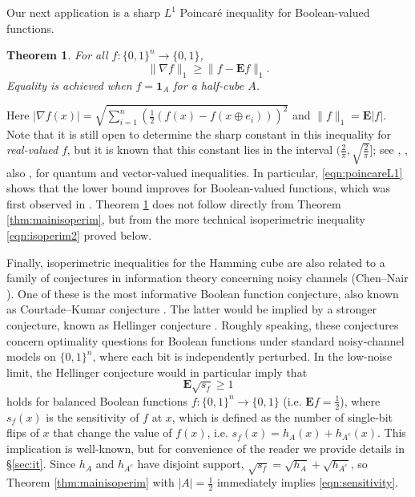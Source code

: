 \documentclass[11pt]{amsart}
\theoremstyle{plain}
\newtheorem{thm}{Theorem}[section]
\theoremstyle{definition}
\theoremstyle{remark}
\numberwithin{equation}{section}
\begin{document}
Our next application is a sharp $L^1$ Poincar\'e inequality for Boolean-valued functions.
\begin{thm}\label{thm:poincare} For all $f:\{0,1\}^n\to \{0,1\}$,
\begin{equation}\label{eqn:poincareL1}
\|\nabla f\|_1\ge \|f-\mathbf{E}f\|_1.
\end{equation}
Equality is achieved when $f=\mathbf{1}_A$ for a half-cube $A$.
\end{thm}
Here $|\nabla f(x)|=\sqrt{\sum_{i=1}^n (\tfrac12(f(x)-f(x\oplus e_i)))^2}$ and $\|f\|_1=\mathbf{E} |f|$. Note that it is still open to determine the sharp constant in this inequality for {\it real-valued} $f$, but it is known that this constant lies in the interval $(\frac2{\pi},\sqrt{\frac{2}{\pi}}]$; see \cite{BELP08}, \cite{ILvHV}, also \cite{haonan1}, \cite{Esken1} for quantum and vector-valued inequalities. In particular, \eqref{eqn:poincareL1} shows that the lower bound improves for Boolean-valued functions, which was first observed in \cite{BIM23}.
Theorem \ref{thm:poincare} does not follow directly from Theorem \ref{thm:mainisoperim}, but from the more technical isoperimetric inequality \eqref{eqn:isoperim2} proved below.

Finally, isoperimetric inequalities for the Hamming cube are also related to a family of conjectures in information theory concerning noisy channels (Chen--Nair \cite{CN24}). One of these is the most informative Boolean function conjecture, also known as Courtade--Kumar conjecture \cite{KC13}.
The latter would be implied by a stronger conjecture, known as Hellinger conjecture \cite{ABCJN17, CGN25}. Roughly speaking, these conjectures concern optimality questions for Boolean functions under standard noisy-channel models on $\{0,1\}^n$, where each bit is independently perturbed.
In the low-noise limit, the Hellinger conjecture would in particular imply that
\begin{equation}\label{eqn:sensitivity}
\mathbf{E}\sqrt{s_f} \ge 1
\end{equation}
holds for balanced Boolean functions $f:\{0,1\}^n\to \{0,1\}$ (i.e. $\mathbf{E}f=\tfrac12$), where $s_f(x)$ is the sensitivity of $f$ at $x$, which is defined as the number of single-bit flips of $x$ that change the value of $f(x)$, i.e. $s_f(x)=h_A(x)+h_{A^c}(x)$.
This implication is well-known, but for convenience of the reader we provide details in \S \ref{sec:it}.
Since $h_A$ and $h_{A^c}$ have disjoint support, $\sqrt{s_f}=\sqrt{h_A}+\sqrt{h_{A^c}}$, so Theorem \ref{thm:mainisoperim} with $|A|=\frac12$ immediately implies \eqref{eqn:sensitivity}.
\end{document}
